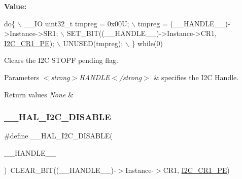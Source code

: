 {\bfseries Value\+:}
\begin{DoxyCode}
\textcolor{keywordflow}{do}\{                                                  \(\backslash\)
    \_\_IO uint32\_t tmpreg = 0x00U;                      \(\backslash\)
    tmpreg = (\_\_HANDLE\_\_)->Instance->SR1;              \(\backslash\)
    SET\_BIT((\_\_HANDLE\_\_)->Instance->CR1, \hyperlink{group___peripheral___registers___bits___definition_ga953b0d38414808db79da116842ed3262}{I2C\_CR1\_PE});  \(\backslash\)
    UNUSED(tmpreg);                                    \(\backslash\)
  \} \textcolor{keywordflow}{while}(0)
\end{DoxyCode}


Clears the I2C S\+T\+O\+PF pending flag. 


\begin{DoxyParams}{Parameters}
{\em $<$strong$>$\+H\+A\+N\+D\+L\+E$<$/strong$>$} & specifies the I2C Handle. \\
\hline
\end{DoxyParams}

\begin{DoxyRetVals}{Return values}
{\em None} & \\
\hline
\end{DoxyRetVals}
\mbox{\label{group___i2_c___exported___macros_ga3d6a35da02ca72537a15570912c80412}} 
\subsubsection{\texorpdfstring{\+\_\+\+\_\+\+H\+A\+L\+\_\+\+I2\+C\+\_\+\+D\+I\+S\+A\+B\+LE}{\_\_HAL\_I2C\_DISABLE}}
{\footnotesize\ttfamily \#define \+\_\+\+\_\+\+H\+A\+L\+\_\+\+I2\+C\+\_\+\+D\+I\+S\+A\+B\+LE(\begin{DoxyParamCaption}\item[{}]{\+\_\+\+\_\+\+H\+A\+N\+D\+L\+E\+\_\+\+\_\+ }\end{DoxyParamCaption})~C\+L\+E\+A\+R\+\_\+\+B\+IT((\+\_\+\+\_\+\+H\+A\+N\+D\+L\+E\+\_\+\+\_\+)-\/$>$Instance-\/$>$C\+R1, \hyperlink{group___peripheral___registers___bits___definition_ga953b0d38414808db79da116842ed3262}{I2\+C\+\_\+\+C\+R1\+\_\+\+PE})}



